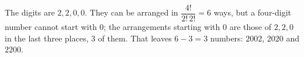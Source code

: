 The digits are $2,2,0,0$. They can be arranged in $\dfrac{4!}{2!\,2!}=6$ ways, but a four-digit number cannot start with $0$; the arrangements starting with $0$ are those of $2,2,0$ in the last three places, $3$ of them. That leaves $6-3=\boxed{3}$ numbers: $2002$, $2020$ and $2200$.
